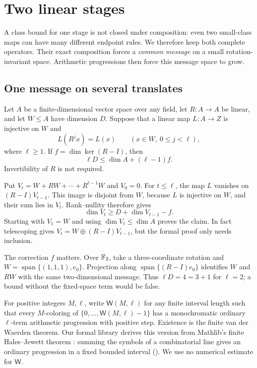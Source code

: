 \section{Two linear stages}
\label{sec:composition}

A class bound for one stage is not closed under composition: even two
small-class maps can have many different endpoint rules.  We therefore
keep both complete operators.  Their exact composition forces a
\emph{common message} on a small rotation-invariant space.  Arithmetic
progressions then force this message space to grow.

\subsection{One message on several translates}

\begin{lemma}\label{lem:common-message}
Let $A$ be a finite-dimensional vector space over any field, let
$R\colon A\to A$ be linear, and let $W\le A$ have dimension $D$.
Suppose that a linear map $L\colon A\to Z$ is injective on $W$ and
\[
 L(R^jx)=L(x)\qquad(x\in W,\ 0\le j<\ell),
\]
where $\ell\ge1$.  If $f=\dim\ker(R-I)$, then
\begin{equation}\label{eq:message-growth}
 \ell D\le \dim A+(\ell-1)f.
\end{equation}
Invertibility of $R$ is not required.
\end{lemma}
\begin{outline}
Put $V_t=W+RW+\cdots+R^{t-1}W$ and $V_0=0$.
For $t\le\ell$, the map $L$ vanishes on $(R-I)V_{t-1}$.
This image is disjoint from $W$, because $L$ is injective on $W$,
and their sum lies in $V_t$.  Rank--nullity therefore gives
\[
 \dim V_t\ge D+\dim V_{t-1}-f.
\]
Starting with $V_1=W$ and using $\dim V_\ell\le\dim A$ proves the
claim.  In fact telescoping gives
$V_t=W\oplus(R-I)V_{t-1}$, but the formal proof only needs inclusion.
\end{outline}

The correction $f$ matters.  Over $\mathbb{F}_2$, take a three-coordinate
rotation and $W=\operatorname{span}\{(1,1,1),e_0\}$.  Projection along
$\operatorname{span}\{(R-I)e_0\}$ identifies $W$ and $RW$ with the same
two-dimensional message.  Thus $\ell D=4=3+1$ for $\ell=2$; a bound
without the fixed-space term would be false.

For positive integers $M,\ell$, write $\mathsf W(M,\ell)$ for any
finite interval length such that every $M$-coloring of
$\{0,\ldots,\mathsf W(M,\ell)-1\}$ has a monochromatic ordinary
$\ell$-term arithmetic progression with positive step.
Existence is the finite van der Waerden theorem.  Our formal library
derives this version from Mathlib's finite Hales--Jewett theorem
\cite{HalesJewett1963}:
summing the symbols of a combinatorial line gives an ordinary progression
in a fixed bounded interval
().  We use no numerical estimate for
$\mathsf W$.

